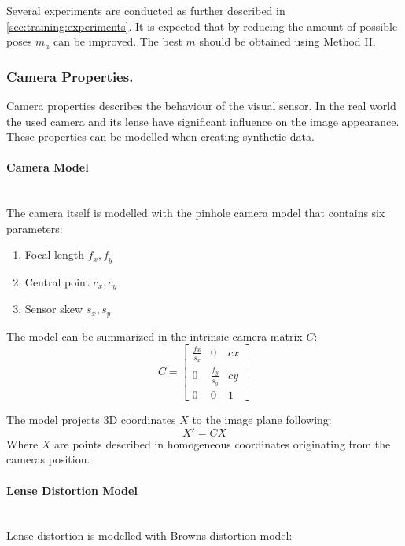 Several experiments are conducted as further described in \autoref{sec:training:experiments}. It is expected that by reducing the amount of possible poses $m_a$ can be improved. The best $m$ should be obtained using Method II.

\subsubsection{Camera Properties.}

Camera properties describes the behaviour of the visual sensor. In the real world the used camera and its lense have significant influence on the image appearance. These properties can be modelled when creating synthetic data.

\paragraph{Camera Model}

\hfill \\
The camera itself is modelled with the pinhole camera model that contains six parameters:

\begin{enumerate}
	\item Focal length $f_x,f_y$
	\item Central point $c_x,c_y$
	\item Sensor skew $s_x, s_y$
\end{enumerate}

The model can be summarized in the intrinsic camera matrix $C$:
\begin{equation}
	C = \begin{bmatrix}
	\frac{fx}{s_x} & 0 &cx \\
	0&  \frac{f_y}{s_y}&cy \\
	0& 	0&	1
	\end{bmatrix}
	\label{eq:pinhole1}
\end{equation}

The model projects 3D coordinates $X$ to the image plane following:
\begin{equation}
	X' = C X
	\label{eq:pinhole2}
\end{equation}
Where $X$ are points described in homogeneous coordinates originating from the cameras position.

\paragraph{Lense Distortion Model}\hfill \\
Lense distortion is modelled with Browns distortion model:

